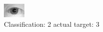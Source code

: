 \begin{figure}[h!]
\begin{center}
\includegraphics[width=0.60\columnwidth]{figures/ID1126_class_2_target_3.png}
\end{center}
\caption{ Classification: 2 actual target: 3}
\label{fig:ID1126_class_2_target_3}
\end{figure}

